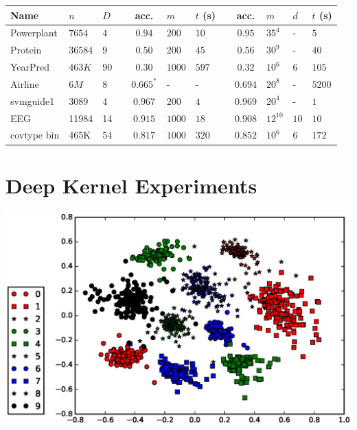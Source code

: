 \documentclass[a0,portrait]{a0poster}
\begin{document}
\begin{multicols}{2}
\begin{center}
\begin{tabular}{lll l cll l clll}
    Name & $n$ & $D$ &&
    acc. & $m$ & $t$ (s) &&
    acc. & $m$ & $d$ & $t$ (s)\\
    \midrule

    Powerplant & $7654$ & $4$ &&
    $0.94$ & $200$ & $10$ &&
    $0.95$ & $35^4$ & - & $5$ \\

    Protein & $36584$ & $9$ &&
    $0.50$ & $200$ & $45$ &&
    $0.56$ & $30^9$ & - & $40$ \\

    YearPred & $463K$ & $90$ &&
    $0.30$ & $1000$ & $597$ &&
    $0.32$ & $10^6$ & $6$ & $105$ \\

    \midrule
    Airline & $6M$ & $8$ &&
    $0.665^*$ & - & - &&
    $0.694$ & $20^8$ & - & $5200$ \\

    svmguide1 & 3089 & 4 &&
    $0.967$ & $200$ & $4$ &&
    $0.969$ & $20^4$ & - & $1$\\

    EEG & 11984 & 14 &&
    $0.915$ & $1000$ & $18$ &&
    $0.908$ & $12^{10}$ & $10$ & $10$\\

    covtype bin & 465K & 54 &&
    $0.817$ & $1000$ & $320$ &&
    $0.852$ & $10^6$ & $6$ & $172$\\
    \bottomrule
  \end{tabular}
\end{center}
\section*{\LARGE \color{NavyBlue} Deep Kernel Experiments}
\citet{wilson2016stochastic}
    
\begin{center}
    \includegraphics[width=20cm]{pics/embed/embedding_2.eps}
\end{center}


\end{multicols}
\end{document}
